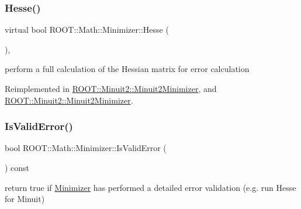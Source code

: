 \mbox{\label{classROOT_1_1Math_1_1Minimizer_ae903e5936bef4ea7fac3301f9cdc50be}} 
\subsubsection{\texorpdfstring{Hesse()}{Hesse()}\hspace{0.1cm}{\footnotesize\ttfamily [2/2]}}
{\footnotesize\ttfamily virtual bool R\+O\+O\+T\+::\+Math\+::\+Minimizer\+::\+Hesse (\begin{DoxyParamCaption}{ }\end{DoxyParamCaption})\hspace{0.3cm}{\ttfamily [inline]}, {\ttfamily [virtual]}}

perform a full calculation of the Hessian matrix for error calculation 

Reimplemented in \mbox{\hyperlink{classROOT_1_1Minuit2_1_1Minuit2Minimizer_a0cfd04fde73c157de423705625ede51c}{R\+O\+O\+T\+::\+Minuit2\+::\+Minuit2\+Minimizer}}, and \mbox{\hyperlink{classROOT_1_1Minuit2_1_1Minuit2Minimizer_a0cfd04fde73c157de423705625ede51c}{R\+O\+O\+T\+::\+Minuit2\+::\+Minuit2\+Minimizer}}.

\mbox{\label{classROOT_1_1Math_1_1Minimizer_aac4dfcda9c3eb7e672d450c0e78c61bf}} 
\subsubsection{\texorpdfstring{IsValidError()}{IsValidError()}\hspace{0.1cm}{\footnotesize\ttfamily [1/2]}}
{\footnotesize\ttfamily bool R\+O\+O\+T\+::\+Math\+::\+Minimizer\+::\+Is\+Valid\+Error (\begin{DoxyParamCaption}{ }\end{DoxyParamCaption}) const\hspace{0.3cm}{\ttfamily [inline]}}



return true if \mbox{\hyperlink{classROOT_1_1Math_1_1Minimizer}{Minimizer}} has performed a detailed error validation (e.\+g. run Hesse for Minuit) 

